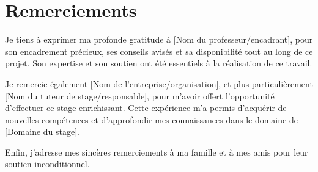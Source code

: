 \chapter*{Remerciements}

Je tiens à exprimer ma profonde gratitude à [Nom du professeur/encadrant], pour son encadrement précieux, ses conseils avisés et sa disponibilité tout au long de ce projet. Son expertise et son soutien ont été essentiels à la réalisation de ce travail.

Je remercie également [Nom de l'entreprise/organisation], et plus particulièrement [Nom du tuteur de stage/responsable], pour m'avoir offert l'opportunité d'effectuer ce stage enrichissant. Cette expérience m'a permis d'acquérir de nouvelles compétences et d'approfondir mes connaissances dans le domaine de [Domaine du stage].

Enfin, j'adresse mes sincères remerciements à ma famille et à mes amis pour leur soutien inconditionnel.
